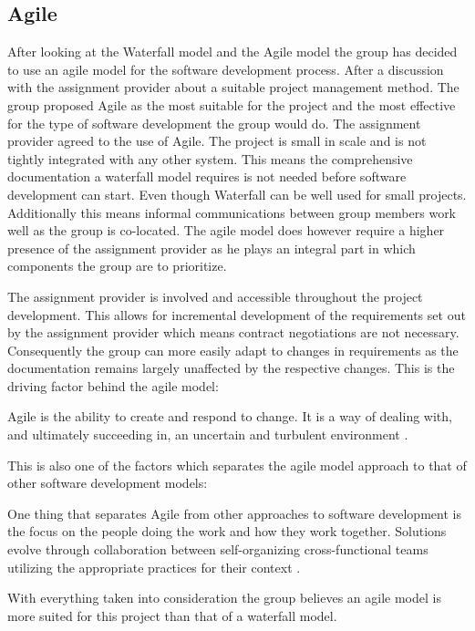 \subsection{Agile} 
After looking at the Waterfall model and the Agile model the group has decided to use an agile model for the software development process. After a discussion with the assignment provider about a suitable project management method. The group proposed Agile as the most suitable for the project and the most effective for the type of software development the group would do\cite{Benefits_of_Agile}. The assignment provider agreed to the use of Agile.  
The project is small in scale and is not tightly integrated with any other system. This means the comprehensive documentation a waterfall model requires is not needed before software development can start. Even though Waterfall can be well used for small projects. Additionally this means informal communications between group members work well as the group is co-located.
The agile model does however require a higher presence of the assignment provider as he plays an integral part in which components the group are to prioritize\cite{high_quality_agile}. 

The assignment provider is involved and accessible throughout the project development.
This allows for incremental development of the requirements set out by the assignment provider which means contract negotiations are not necessary.
Consequently the group can more easily adapt to changes in requirements as the documentation remains largely unaffected by the respective changes.
This is the driving factor behind the agile model:
\begin{displayquote}
Agile is the ability to create and respond to change.
It is a way of dealing with, and ultimately succeeding in, an uncertain and turbulent environment \cite{what-is-agile}.
\end{displayquote}
This is also one of the factors which separates the agile model approach to that of other software development models:

\begin{displayquote}
One thing that separates Agile from other approaches to software development is the focus on the people doing the work and how they work together.
Solutions evolve through collaboration between self-organizing cross-functional teams utilizing the appropriate practices for their context \cite{what-is-agile-software-development}.
\end{displayquote}
With everything taken into consideration the group believes an agile model is more suited for this project than that of a waterfall model.

